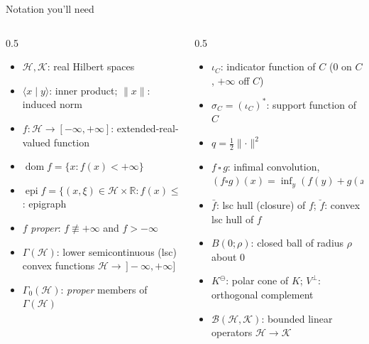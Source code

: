 \documentclass[aspectratio=169,10pt]{beamer}
\newcommand{\R}{\mathbb{R}}
\newcommand{\Hil}{\mathcal{H}}
\newcommand{\Kil}{\mathcal{K}}
\newcommand{\inner}[2]{\langle #1 \mid #2 \rangle}
\newcommand{\norm}[1]{\lVert #1 \rVert}
\newcommand{\dom}{\operatorname{dom}}
\newcommand{\epi}{\operatorname{epi}}
\newcommand{\iotaC}{\iota_C}
\newcommand{\sigmaC}{\sigma_C}
\newcommand{\GammaZero}{\Gamma_0(\Hil)}
\newcommand{\Gammabig}{\Gamma(\Hil)}
\newcommand{\conj}[1]{#1^{*}}
\begin{document}
\begin{frame}{Notation you'll need}
  \begin{columns}[t]
    \begin{column}{0.5\textwidth}
      \begin{itemize}
        \item $\Hil, \Kil$: real Hilbert spaces
        \item $\inner{x}{y}$: inner product; $\norm{x}$: induced norm
        \item $f: \Hil \to [-\infty,+\infty]$: extended-real-valued function
        \item $\dom f = \{x : f(x) < +\infty\}$
        \item $\epi f = \{(x,\xi)\in\Hil\times\R : f(x)\le \xi\}$: epigraph
        \item $f$ \emph{proper}: $f \not\equiv +\infty$ and $f > -\infty$
        \item $\Gammabig$: lower semicontinuous (lsc) convex functions
          $\Hil\to\,]-\infty,+\infty]$
        \item $\GammaZero$: \emph{proper} members of $\Gammabig$
      \end{itemize}
    \end{column}
    \begin{column}{0.5\textwidth}
      \begin{itemize}
        \item $\iotaC$: indicator function of $C$ ($0$ on $C$, $+\infty$
          off $C$)
        \item $\sigmaC = \conj{(\iotaC)}$: support function of $C$
        \item $q = \tfrac12\norm{\cdot}^2$
        \item $f\,\square\,g$: infimal convolution,
          $(f\square g)(x)=\inf_y (f(y)+g(x-y))$
        \item $\bar f$: lsc hull (closure) of $f$; $\breve f$: convex lsc
          hull of $f$
        \item $B(0;\rho)$: closed ball of radius $\rho$ about $0$
        \item $K^{\ominus}$: polar cone of $K$; $V^{\perp}$: orthogonal
          complement
        \item $\mathcal B(\Hil,\Kil)$: bounded linear operators $\Hil\to\Kil$
      \end{itemize}
    \end{column}
  \end{columns}
\end{frame}
\end{document}

